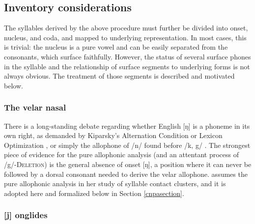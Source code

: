 \subsection{Inventory considerations}

The syllables derived by the above procedure must further be divided into onset, nucleus, and coda, and mapped to underlying representation. In most cases, this is trivial: the nucleus is a pure vowel and can be easily separated from the consonants, which surface faithfully. However, the status of several surface phones in the syllable and the relationship of surface segments to underlying forms is not always obvious. The treatment of those segments is described and motivated below. 

\subsubsection{The velar nasal}
\label{velarnasal}

There is a long-standing debate regarding whether English [ŋ] is a phoneme in its own right, as demanded by Kiparsky's Alternation Condition \citep{Kiparsky1968} or Lexicon Optimization \citep[][53]{OT}, or simply the allophone of /n/ found before /k, g/ \citep[][65]{Borowsky1986}. The strongest piece of evidence for the pure allophonic analysis (and an attentant process of /g/-\textsc{Deletion}) is the general absence of onset [ŋ], a position where it can never be followed by a dorsal consonant needed to derive the velar allophone. \citet{Pierrehumbert1994} assumes the pure allophonic analysis in her study of syllable contact clusters, and it is adopted here and formalized below in Section \ref{cnpasection}.

\subsubsection{[j] onglides}

